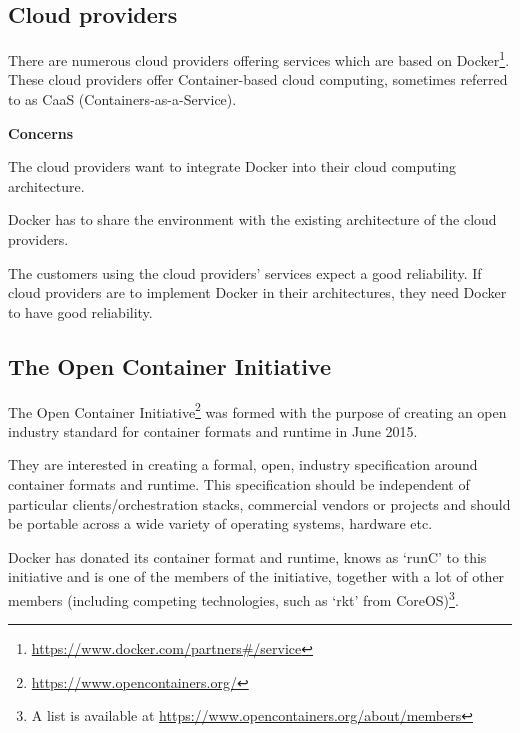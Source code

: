 \subsection*{Cloud providers}
There are numerous cloud providers offering services which are based on Docker\footnote{\url{https://www.docker.com/partners\#/service}}. These cloud providers offer Container-based cloud computing, sometimes referred to as CaaS (Containers-as-a-Service).


\textbf{Concerns}
\begin{description}[labelindent=25pt,style=multiline,leftmargin=4.0cm,font=\normalfont\itshape]

\item[Implementability] The cloud providers want to integrate Docker into their cloud computing architecture.

\item[Co-Existence] Docker has to share the environment with the existing architecture of the cloud providers.

\item[Reliability] The customers using the cloud providers' services expect a good reliability. If cloud providers are to implement Docker in their architectures, they need Docker to have good reliability.

\end{description}



\subsection*{The Open Container Initiative}

The Open Container Initiative\footnote{\url{https://www.opencontainers.org/}} was formed with the purpose of creating an open industry standard for container formats and runtime in June 2015.

They are interested in creating a formal, open, industry specification around container formats and runtime. This specification should be independent of particular clients/orchestration stacks, commercial vendors or projects and should be portable across a wide variety of operating systems, hardware etc.

Docker has donated its container format and runtime, knows as `runC' to this initiative and is one of the members of the initiative, together with a lot of other members (including competing technologies, such as `rkt' from CoreOS)\footnote{A list is available at \url{https://www.opencontainers.org/about/members}}.

